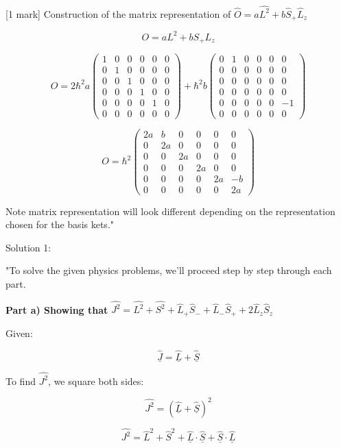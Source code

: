 [1 mark] Construction of the matrix representation of \( \hat{O} = a\hat{L^{2}} + b\hat{S}_{+}\hat{L}_{z} \)

\[ O = a L^2 + b S_{+}L_z \]

\[
O = 2\hbar^2 a \begin{pmatrix} 1 & 0 & 0 & 0 & 0 & 0\\  0 & 1 & 0 & 0 & 0 & 0\\ 0 & 0 & 1 & 0 & 0 & 0\\ 0 & 0 & 0 & 1 & 0 & 0\\ 0 & 0 & 0 & 0 & 1 & 0\\ 0 & 0 & 0 & 0 & 0 & 0 \end{pmatrix} + \hbar^2 b \begin{pmatrix} 0 & 1 & 0 & 0 & 0 & 0\\ 0 & 0 & 0 & 0 & 0 & 0\\ 0 & 0 & 0 & 0 & 0 & 0\\ 0 & 0 & 0 & 0 & 0 & 0\\ 0 & 0 & 0 & 0 & 0 & -1\\ 0 & 0 & 0 & 0 & 0 & 0 \end{pmatrix}
\]

\[ 
O = \hbar^2 \begin{pmatrix} 2a & b & 0 & 0 & 0 & 0\\ 0 & 2a & 0 & 0 & 0 & 0\\ 0 & 0 & 2a & 0 & 0 & 0\\ 0 & 0 & 0 & 2a & 0 & 0\\ 0 & 0 & 0 & 0 & 2a & -b\\ 0 & 0 & 0 & 0 & 0 & 2a \end{pmatrix}
\]

Note matrix representation will look different depending on the representation chosen for the basis kets."

Solution 1:

"To solve the given physics problems, we'll proceed step by step through each part.

\textbf{Part a) Showing that} \( \hat{J^{2}} = \hat{L^{2}} + \hat{S^{2}} + \hat{L}_{+}\hat{S}_{-} + \hat{L}_{-}\hat{S}_{+} + 2\hat{L}_{z}\hat{S}_{z} \)

Given:

\[ \hat{\underline{J}} = \hat{\underline{L}} + \hat{\underline{S}} \]

To find \( \hat{J^{2}} \), we square both sides:

\[ \hat{J^{2}} = (\hat{\underline{L}} + \hat{\underline{S}})^2 \]

\[ \hat{J^{2}} = \hat{L}^2 + \hat{S}^2 + \hat{\underline{L}} \cdot \hat{\underline{S}} + \hat{\underline{S}} \cdot \hat{\underline{L}} \]

